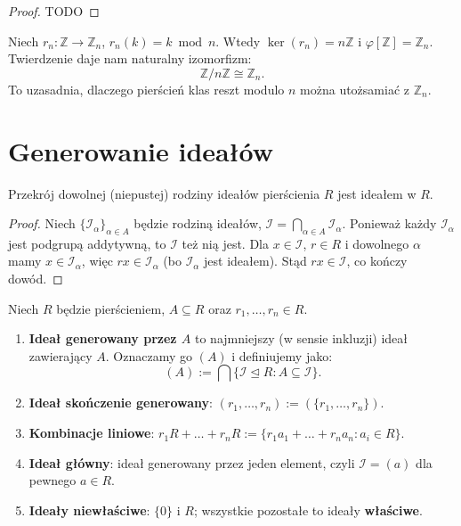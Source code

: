 \begin{proof}
	TODO
\end{proof} 
\begin{eg}
Niech $r_n: \mathbb{Z} \to \mathbb{Z}_n$, $r_n(k) = k \bmod n$. Wtedy $\ker(r_n) = n\mathbb{Z}$ i $\varphi[\mathbb{Z}] = \mathbb{Z}_n$. Twierdzenie daje nam naturalny izomorfizm:
\[
\mathbb{Z}/n\mathbb{Z} \cong \mathbb{Z}_n.
\]
To uzasadnia, dlaczego pierścień klas reszt modulo $n$ można utożsamiać z $\mathbb{Z}_n$.
\end{eg}

\section{Generowanie ideałów}

\begin{fact}
Przekrój dowolnej (niepustej) rodziny ideałów pierścienia $R$ jest ideałem w $R$.
\end{fact}

\begin{proof}
Niech $\{\mathcal{I}_\alpha\}_{\alpha \in A}$ będzie rodziną ideałów, $\mathcal{I} = \bigcap_{\alpha \in A} \mathcal{I}_\alpha$. Ponieważ każdy $\mathcal{I}_\alpha$ jest podgrupą addytywną, to $\mathcal{I}$ też nią jest. Dla $x \in \mathcal{I}$, $r \in R$ i dowolnego $\alpha$ mamy $x \in \mathcal{I}_\alpha$, więc $rx \in \mathcal{I}_\alpha$ (bo $\mathcal{I}_\alpha$ jest ideałem). Stąd $rx \in \mathcal{I}$, co kończy dowód.
\end{proof}

\begin{definition}
Niech $R$ będzie pierścieniem, $A \subseteq R$ oraz $r_1, \dots, r_n \in R$.
\begin{enumerate}[label=\arabic*)]
\item \textbf{Ideał generowany przez $A$} to najmniejszy (w sensie inkluzji) ideał zawierający $A$. Oznaczamy go $(A)$ i definiujemy jako:
\[
(A) := \bigcap \{ \mathcal{I} \trianglelefteq R : A \subseteq \mathcal{I} \}.
\]
\item \textbf{Ideał skończenie generowany}: $(r_1, \dots, r_n) := (\{r_1, \dots, r_n\})$.
\item \textbf{Kombinacje liniowe}: $r_1R + \dots + r_nR := \{ r_1a_1 + \dots + r_na_n : a_i \in R \}$.
\item \textbf{Ideał główny}: ideał generowany przez jeden element, czyli $\mathcal{I} = (a)$ dla pewnego $a \in R$.
\item \textbf{Ideały niewłaściwe}: $\{0\}$ i $R$; wszystkie pozostałe to ideały \textbf{właściwe}.
\end{enumerate}
\end{definition}

